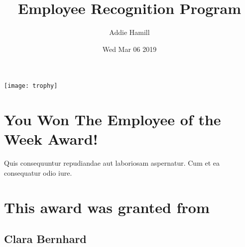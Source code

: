 \documentclass[12pt, letterpaper]{article}
\title{Employee Recognition Program}
\author{Addie Hamill}
\date{Wed Mar 06 2019}
\begin{document}
\maketitle
\begin{center}
\texttt{[image: trophy]}
\section*{You Won The Employee of the Week Award!}
Quis consequuntur repudiandae aut laboriosam aspernatur. Cum et ea consequatur odio iure.
\section*{This award was granted from}
\subsection*{Clara Bernhard}
\end{center}
\end{document}
